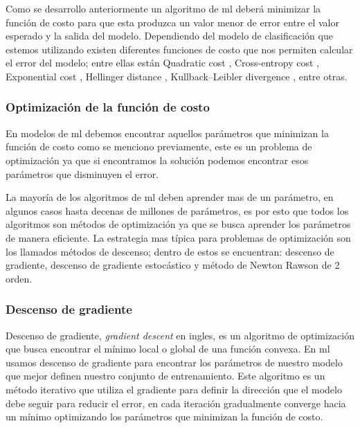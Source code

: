 Como se desarrollo anteriormente un algoritmo de \ac{ml} deberá minimizar la función de costo para que esta produzca un valor menor de error entre el valor esperado y la salida del modelo. Dependiendo del modelo de clasificación que estemos utilizando existen diferentes funciones de costo que nos permiten calcular el error del modelo; entre ellas están Quadratic cost \citep{quadratic_cost}, Cross-entropy cost \citep{cross_entropy}, Exponential cost \citep{exponential_cost}, Hellinger distance \citep{Hellinger}, Kullback–Leibler divergence \citep{kullback}, entre otras.


\subsubsection{Optimización de la función de costo} 
En modelos de \ac{ml} debemos encontrar aquellos parámetros que minimizan la función de costo como se menciono previamente, este es un problema de optimización ya que si encontramos la solución podemos encontrar esos parámetros que disminuyen el error.

La mayoría de los algoritmos de \ac{ml} deben aprender mas de un parámetro, en algunos casos hasta decenas de millones de parámetros, es por esto que todos los algoritmos  son métodos de optimización ya que se busca aprender los parámetros de manera eficiente. La estrategia mas típica para problemas de optimización son los llamados métodos de descenso; dentro de estos se encuentran: descenso de gradiente, descenso de gradiente estocástico y método de Newton Rawson de 2 orden.

\subsubsection{Descenso de gradiente}\label{sub:gradient-desc}
Descenso de gradiente, \textit{gradient descent} en ingles, es un algoritmo de optimización que busca encontrar el mínimo local o global de una función convexa.  En \ac{ml} usamos descenso de gradiente para encontrar los parámetros de nuestro modelo que mejor definen nuestro conjunto de entrenamiento. Este algoritmo es un método iterativo que utiliza el gradiente para definir la dirección que el modelo debe seguir para reducir el error, en cada iteración gradualmente converge hacia un mínimo optimizando los parámetros que minimizan la función de costo. 


